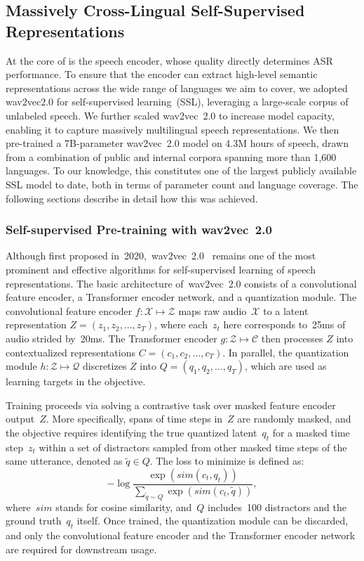 \documentclass[]{fairmeta}
\begin{document}
\subsection{Massively Cross-Lingual Self-Supervised Representations}
\label{sec:w2v2}

At the core of \OmniASR is the speech encoder, whose quality directly determines ASR performance. To ensure that the encoder can extract high-level semantic representations across the wide range of languages we aim to cover, we adopted wav2vec2.0 \citep{baevski2020wav2vec} for self-supervised learning~(SSL), leveraging a large-scale corpus of unlabeled speech. We further scaled wav2vec~2.0 to increase model capacity, enabling it to capture massively multilingual speech representations. We then pre-trained a 7B-parameter wav2vec~2.0 model on 4.3M hours of speech, drawn from a combination of public and internal corpora spanning more than 1,600 languages. To our knowledge, this constitutes one of the largest publicly available SSL model to date, both in terms of parameter count and language coverage. The following sections describe in detail how this was achieved.

\subsubsection{Self-supervised Pre-training with wav2vec~2.0}
Although first proposed in~2020,~wav2vec~2.0~\citep{baevski2020wav2vec} remains one of the most prominent and effective algorithms for self-supervised learning of speech representations. The basic architecture of~wav2vec~2.0 consists of a convolutional feature encoder, a Transformer encoder network, and a quantization module. The convolutional feature encoder $f: \mathcal{X} \mapsto \mathcal{Z}$ maps raw audio~$\mathcal{X}$ to a latent representation $Z = (z_1, z_2, ..., z_T)$, where each~$z_t$ here corresponds to~25ms of audio strided by~20ms. The Transformer encoder $g: \mathcal{Z} \mapsto \mathcal{C}$ then processes $Z$ into contextualized representations $C = (c_1, c_2, \ldots, c_T)$. In parallel, the quantization module $h: \mathcal{Z} \mapsto \mathcal{Q}$ discretizes $Z$ into $Q = (q_1, q_2, \ldots, q_T)$, which are used as learning targets in the objective.

Training proceeds via solving a contrastive task over masked feature encoder output~$Z$. More specifically, spans of time steps in~$Z$ are randomly masked, and the objective requires identifying the true quantized latent~$q_t$ for a masked time step~$z_t$ within a set of distractors sampled from other masked time steps of the same utterance, denoted as $\tilde{q}\in Q$. The loss to minimize is defined as:
\begin{equation}
    -\log \frac{\exp(sim(c_t, q_t))}{\sum_{\tilde{q}\sim Q} \exp(sim(c_t, \tilde{q}))},
\end{equation}
where~$sim$ stands for cosine similarity, and~$Q$ includes~100 distractors and the ground truth~$q_t$ itself.  Once trained, the quantization module can be discarded, and only the convolutional feature encoder and the Transformer encoder network are required for downstream usage.
\end{document}
